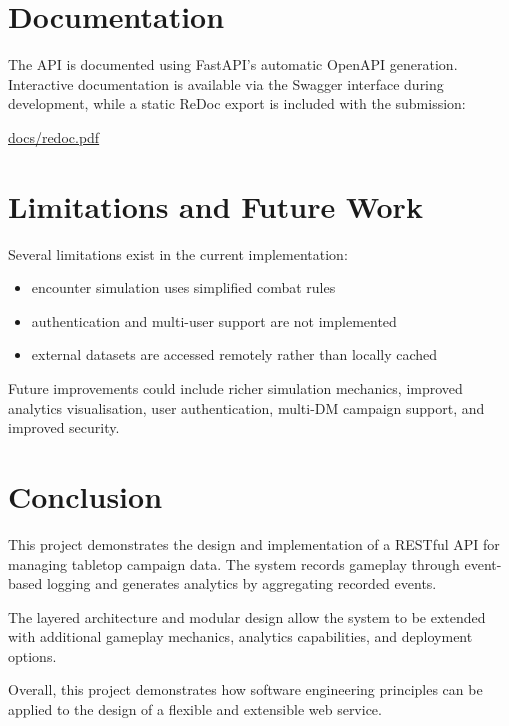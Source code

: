 \documentclass[11pt]{article}
\begin{document}
\section{Documentation}

The API is documented using FastAPI's automatic OpenAPI generation.
Interactive documentation is available via the Swagger interface during
development, while a static ReDoc export is included with the submission:

\begin{center}
\url{docs/redoc.pdf}
\end{center}


\section{Limitations and Future Work}

Several limitations exist in the current implementation:

\begin{itemize}
\item encounter simulation uses simplified combat rules
\item authentication and multi-user support are not implemented
\item external datasets are accessed remotely rather than locally cached
\end{itemize}

Future improvements could include richer simulation mechanics, improved
analytics visualisation, user authentication, multi-DM campaign support,
and improved security.


\section{Conclusion}

This project demonstrates the design and implementation of a RESTful API
for managing tabletop campaign data. The system records gameplay through
event-based logging and generates analytics by aggregating recorded
events.

The layered architecture and modular design allow the system to be
extended with additional gameplay mechanics, analytics capabilities,
and deployment options.

Overall, this project demonstrates how software engineering principles
can be applied to the design of a flexible and extensible web service.
\end{document}
